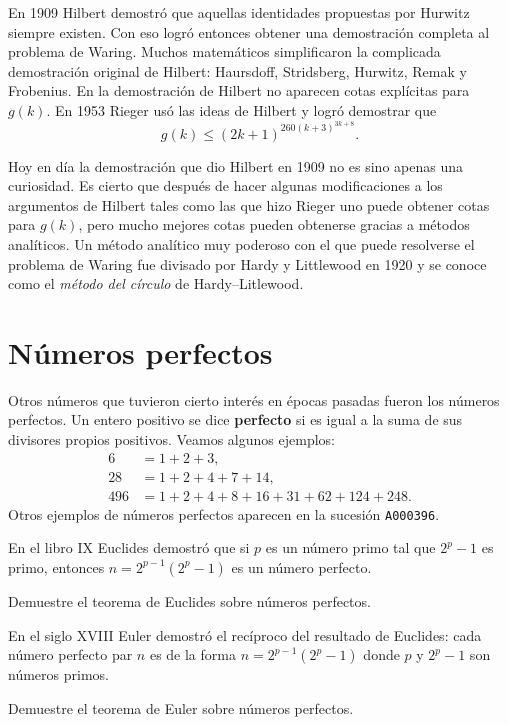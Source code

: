 En 1909 Hilbert demostró que aquellas identidades propuestas por Hurwitz
siempre existen. Con eso logró entonces obtener una demostración completa al
problema de Waring.  Muchos matemáticos simplificaron la complicada demostración
original de Hilbert: Haursdoff, Stridsberg, Hurwitz, Remak y Frobenius. En la
demostración de Hilbert no aparecen cotas explícitas para $g(k)$. En 1953
Rieger usó las ideas de Hilbert y logró demostrar que 
\[
	g(k)\leq (2k+1)^{260(k+3)^{3k+8}}.
\]

Hoy en día la demostración que dio Hilbert en 1909 no es sino apenas una
curiosidad. Es cierto que después de hacer algunas modificaciones a los
argumentos de Hilbert tales como las que hizo Rieger uno puede obtener cotas
para $g(k)$, pero mucho mejores cotas pueden obtenerse gracias a métodos
analíticos. Un método analítico muy poderoso con el que puede resolverse
el problema de Waring fue divisado por Hardy y Littlewood en 1920 y se conoce
como el \emph{método del círculo} de Hardy--Litlewood. 

\section*{Números perfectos}

Otros números que tuvieron cierto interés en épocas pasadas fueron los números
perfectos. Un entero positivo se dice \textbf{perfecto} si es igual a la suma
de sus divisores propios positivos. Veamos algunos ejemplos:
\begin{align*}
	6 &= 1+2+3,\\
	28 &= 1+2+4+7+14,\\
	496 &= 1 + 2 + 4 + 8 + 16 + 31 + 62 + 124 + 248.
\end{align*}
Otros ejemplos de números perfectos aparecen en la sucesión \verb+A000396+.  

En el libro IX Euclides demostró que si $p$ es un número primo tal que $2^p-1$
es primo, entonces $n=2^{p-1}(2^p-1)$ es un número perfecto. 

\begin{exercise}
	Demuestre el teorema de Euclides sobre números perfectos.
\end{exercise}

En el siglo XVIII
Euler demostró el recíproco del resultado de Euclides: cada número perfecto par
$n$ es de la forma $n=2^{p-1}(2^p-1)$ donde $p$ y $2^{p}-1$ son números primos. 

\begin{exercise}
	Demuestre el teorema de Euler sobre números perfectos.
\end{exercise}


